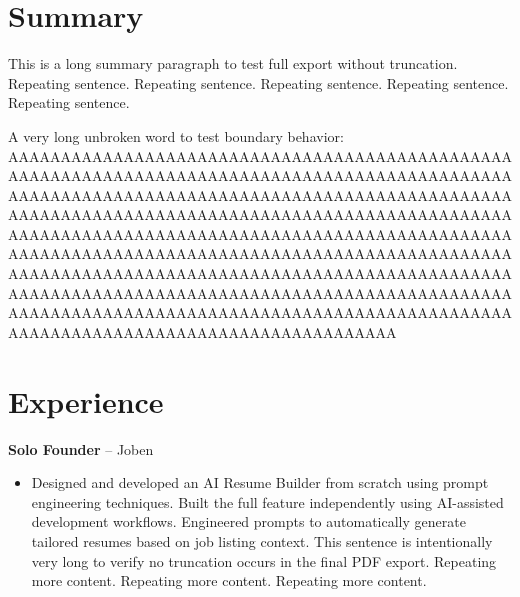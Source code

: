 ﻿\documentclass[letterpaper,11pt]{article}
\begin{document}
\section*{Summary}
This is a long summary paragraph to test full export without truncation. Repeating sentence. Repeating sentence. Repeating sentence. Repeating sentence. Repeating sentence.

A very long unbroken word to test boundary behavior: AAAAAAAAAAAAAAAAAAAAAAAAAAAAAAAAAAAAAAAAAAAAAAAAAAAAAAAAAAAAAAAAAAAAAAAAAAAAAAAAAAAAAAAAAAAAAAAAAAAAAAAAAAAAAAAAAAAAAAAAAAAAAAAAAAAAAAAAAAAAAAAAAAAAAAAAAAAAAAAAAAAAAAAAAAAAAAAAAAAAAAAAAAAAAAAAAAAAAAAAAAAAAAAAAAAAAAAAAAAAAAAAAAAAAAAAAAAAAAAAAAAAAAAAAAAAAAAAAAAAAAAAAAAAAAAAAAAAAAAAAAAAAAAAAAAAAAAAAAAAAAAAAAAAAAAAAAAAAAAAAAAAAAAAAAAAAAAAAAAAAAAAAAAAAAAAAAAAAAAAAAAAAAAAAAAAAAAAAAAAAAAAAAAAAAAAAAAAAAAAAAAAAAAAAAAAAAAAAAAAAAAAAAAAAAAAAAAAAAAAAAAAAAAAAAAAAAAAAAAAAAAAAAAAA

\section*{Experience}
\textbf{Solo Founder} -- Joben\\
\begin{itemize}
\item Designed and developed an AI Resume Builder from scratch using prompt engineering techniques. Built the full feature independently using AI-assisted development workflows. Engineered prompts to automatically generate tailored resumes based on job listing context. This sentence is intentionally very long to verify no truncation occurs in the final PDF export. Repeating more content. Repeating more content. Repeating more content.
\end{itemize}
\end{document}
